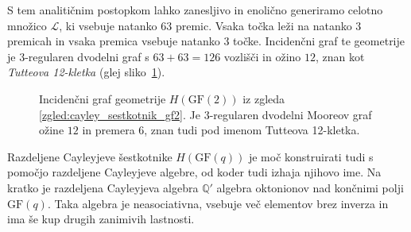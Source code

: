 \documentclass[fin1, tisk]{fmfdelo}
\newcommand{\LL}{\mathcal{L}}
\newcommand{\GF}{\mathrm{GF}}
\begin{document}
\begin{zgled}
    S tem analitičnim postopkom lahko zanesljivo in enolično generiramo celotno množico $\LL$, 
    ki vsebuje natanko $63$ premic. Vsaka točka leži na natanko $3$ premicah in vsaka premica 
    vsebuje natanko $3$ točke. Incidenčni graf te geometrije je $3$-regularen 
    dvodelni graf s $63 + 63 = 126$ vozlišči in ožino $12$, znan kot \emph{Tutteova 12-kletka} (glej sliko~\ref{fig:tutte12cage}).
\end{zgled}


\begin{figure}[htbp]
    \centering
    \caption{Incidenčni graf geometrije $H(\GF(2))$ iz zgleda \ref{zgled:cayley_sestkotnik_gf2}. 
    Je $3$-regularen dvodelni Mooreov graf ožine $12$ in premera $6$, znan tudi pod imenom Tutteova 12-kletka.}
    \label{fig:tutte12cage}
\end{figure}

\begin{opomba}
    Razdeljene Cayleyjeve šestkotnike $H(\GF(q))$ je moč konstruirati tudi s pomočjo razdeljene Cayleyjeve algebre, od koder tudi izhaja njihovo ime.
    Na kratko je razdeljena Cayleyjeva algebra $\mathbb{Q}'$ algebra oktonionov nad končnimi polji $\GF(q)$. Taka algebra je neasociativna,
    vsebuje več elementov brez inverza in ima še kup drugih zanimivih lastnosti.
\end{opomba}



\end{document}
